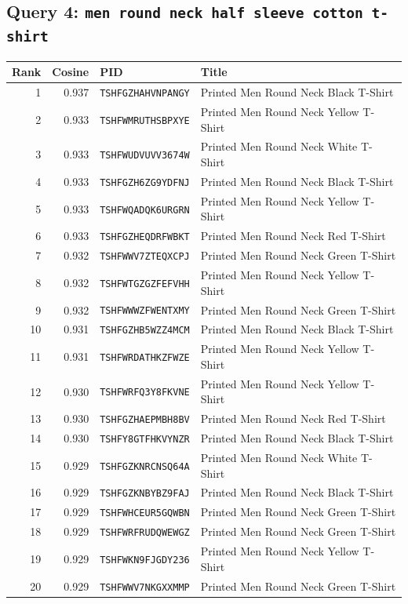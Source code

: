 \subsection*{Query 4: \texttt{men round neck half sleeve cotton t-shirt}}
\begin{longtable}{r r l p{}}
\toprule
Rank & Cosine & PID & Title \\
\midrule
\endhead
1 & 0.937 & \texttt{TSHFGZHAHVNPANGY} & Printed Men Round Neck Black T-Shirt \\
2 & 0.933 & \texttt{TSHFWMRUTHSBPXYE} & Printed Men Round Neck Yellow T-Shirt \\
3 & 0.933 & \texttt{TSHFWUDVUVV3674W} & Printed Men Round Neck White T-Shirt \\
4 & 0.933 & \texttt{TSHFGZH6ZG9YDFNJ} & Printed Men Round Neck Black T-Shirt \\
5 & 0.933 & \texttt{TSHFWQADQK6URGRN} & Printed Men Round Neck Yellow T-Shirt \\
6 & 0.933 & \texttt{TSHFGZHEQDRFWBKT} & Printed Men Round Neck Red T-Shirt \\
7 & 0.932 & \texttt{TSHFWWV7ZTEQXCPJ} & Printed Men Round Neck Green T-Shirt \\
8 & 0.932 & \texttt{TSHFWTGZGZFEFVHH} & Printed Men Round Neck Yellow T-Shirt \\
9 & 0.932 & \texttt{TSHFWWWZFWENTXMY} & Printed Men Round Neck Green T-Shirt \\
10 & 0.931 & \texttt{TSHFGZHB5WZZ4MCM} & Printed Men Round Neck Black T-Shirt \\
11 & 0.931 & \texttt{TSHFWRDATHKZFWZE} & Printed Men Round Neck Yellow T-Shirt \\
12 & 0.930 & \texttt{TSHFWRFQ3Y8FKVNE} & Printed Men Round Neck Yellow T-Shirt \\
13 & 0.930 & \texttt{TSHFGZHAEPMBH8BV} & Printed Men Round Neck Red T-Shirt \\
14 & 0.930 & \texttt{TSHFY8GTFHKVYNZR} & Printed Men Round Neck Black T-Shirt \\
15 & 0.929 & \texttt{TSHFGZKNRCNSQ64A} & Printed Men Round Neck White T-Shirt \\
16 & 0.929 & \texttt{TSHFGZKNBYBZ9FAJ} & Printed Men Round Neck Black T-Shirt \\
17 & 0.929 & \texttt{TSHFWHCEUR5GQWBN} & Printed Men Round Neck Green T-Shirt \\
18 & 0.929 & \texttt{TSHFWRFRUDQWEWGZ} & Printed Men Round Neck Green T-Shirt \\
19 & 0.929 & \texttt{TSHFWKN9FJGDY236} & Printed Men Round Neck Yellow T-Shirt \\
20 & 0.929 & \texttt{TSHFWWV7NKGXXMMP} & Printed Men Round Neck Green T-Shirt \\
\end{longtable}
